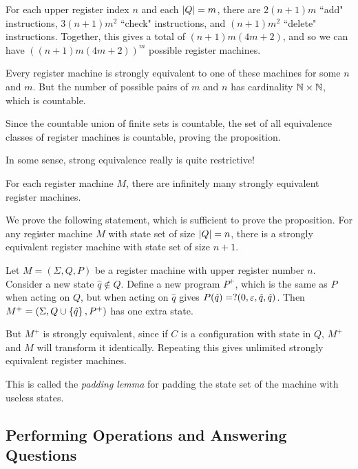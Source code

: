 \documentclass{article}
\begin{document}
\begin{prf}
	For each upper register index $n$ and each $\left\lvert Q \right\rvert = m$, there are $2(n+1)m$ ``add" instructions, $3(n+1)m^2$ ``check" instructions, and $(n+1)m^2$ ``delete" instructions. Together, this gives a total of $(n+1)m(4m+2)$, and so we can have $((n+1)m(4m+2))^m$ possible register machines.
	    
	Every register machine is strongly equivalent to one of these machines for some $n$ and $m$. But the number of possible pairs of $m$ and $n$ has cardinality $\mathbb{N} \times \mathbb{N}$, which is countable.
	    
	Since the countable union of finite sets is countable, the set of all equivalence classes of register machines is countable, proving the proposition.
\end{prf}

In some sense, strong equivalence really is quite restrictive!

\begin{proposition}
	\label{padding-lemma}
	For each register machine $M$, there are infinitely many strongly equivalent register machines.
\end{proposition}

\begin{prf}
	We prove the following statement, which is sufficient to prove the proposition. For any register machine $M$ with state set of size $\left\lvert Q \right\rvert = n$, there is a strongly equivalent register machine with state set of size $n+1$.
	    
	Let $M = (\Sigma, Q, P)$ be a register machine with upper register number $n$. Consider a new state $\hat q \notin Q$. Define a new program $P^+$, which is the same as $P$ when acting on $Q$, but when acting on $\hat q$ gives $P(\hat q) = ?(0, \varepsilon, \hat q, \hat q)$. Then $M^+ = (\Sigma, Q \cup \left\lbrace \hat q \right\rbrace, P^+)$ has one extra state.
	    
	But $M^+$ is strongly equivalent, since if $C$ is a configuration with state in $Q$, $M^+$ and $M$ will transform it identically. Repeating this gives unlimited strongly equivalent register machines.
\end{prf}

This is called the \textit{padding lemma} for padding the state set of the machine with useless states.

\subsection{Performing Operations and Answering Questions}
\end{document}
